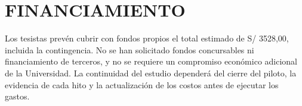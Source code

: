 \section{FINANCIAMIENTO}
\label{sec:financiamiento}

Los tesistas prevén cubrir con fondos propios el total estimado de S/ 3528,00, incluida la contingencia. No se han solicitado fondos concursables ni financiamiento de terceros, y no se requiere un compromiso económico adicional de la Universidad. La continuidad del estudio dependerá del cierre del piloto, la evidencia de cada hito y la actualización de los costos antes de ejecutar los gastos.

